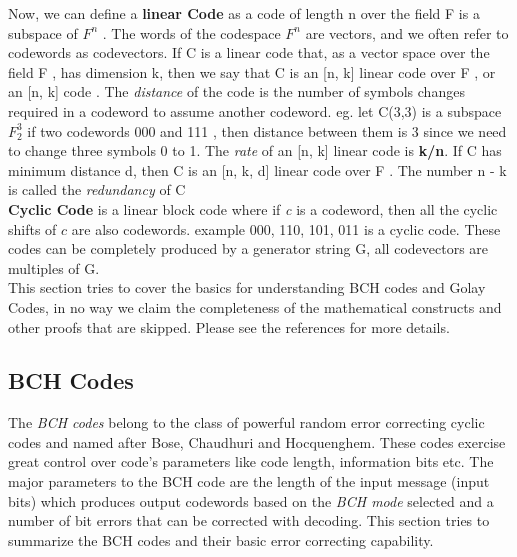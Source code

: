 Now, we can define a \textbf{linear Code} as a code of length n over the field F is a subspace of $F^n$ . The words of the codespace $F^n$ are vectors, and we often refer to codewords as codevectors.
If C is a linear code that, as a vector space over the field F , has dimension k,
then we say that C is an [n, k] linear code over F , or an [n, k] code \cite{linear}. The \emph{distance} of the code is the number of symbols changes required in a codeword to assume another codeword. eg. let C(3,3) is a subspace $F_2^3$ if two codewords 000 and 111 , then distance between them is 3 since we need to change three symbols 0 to 1.
The \emph{rate} of an [n, k] linear code is \textbf{k/n}. If C has minimum distance d, then C is an [n, k, d] linear code over F .
The number n - k is called the \emph{redundancy} of C \cite{linear}\\

\textbf{Cyclic Code} is a linear block code where if \emph{c} is a codeword, then all the cyclic shifts of $c$ are also codewords.
example {000, 110, 101, 011} is a cyclic code.
These codes can be completely produced by a generator string G, all codevectors are multiples of G.\\

This section tries to cover the basics for understanding BCH codes and Golay Codes, in no way we claim the completeness of the mathematical constructs and other proofs that are skipped. Please see the references for more details.\\

\subsection{BCH Codes}
\label{bch_section}
The \emph{BCH codes} belong to the class of powerful random error correcting cyclic codes and named after Bose, Chaudhuri and Hocquenghem. These codes exercise great control over code's parameters like code length, information bits etc. The major parameters to the BCH code are the length of the input message (input bits) which produces output codewords based on the \emph{BCH mode} selected and a number of bit errors that can be corrected with decoding. This section tries to summarize the BCH codes and
their basic error correcting capability.\\

